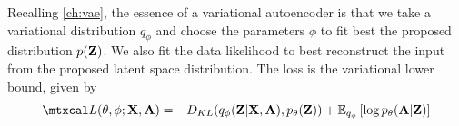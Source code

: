 \begin{lvae}

Recalling \autoref{ch:vae}, the essence of a variational autoencoder is that we take a variational distribution $q_\phi$ and choose the parameters $\phi$ to fit best the proposed distribution $p(\mathbf{Z})$. We also fit the data likelihood to best reconstruct the input from the proposed latent space distribution. The loss is the variational lower bound, given by
\begin{equation}
\Ls(\theta,\phi;\bX,\bA)=-D_{KL}(q_\phi(\bZ|\bX,\bA), p_\theta(\bZ))+\mathbb{E}_{q_\phi}\left[\log p_\theta(\bA|\bZ)\right]
\end{equation}

\end{lvae}
